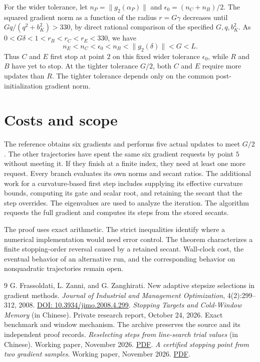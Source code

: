 \documentclass[11pt]{article}
\newcommand{\norm}[1]{\lVert#1\rVert}
\begin{document}
For the wider tolerance, let
\(n_P=\norm{g_2(\alpha_P)}\) and \(\epsilon_0=(n_C+n_B)/2\).
The squared gradient norm as a function of the radius \(r=G\gamma\)
decreases until \(Gq/(q^2+b_K^2)>330\), by direct rational
comparison of the specified \(G,q,b_K^2\).
As \(0<G\delta<1<r_B<r_C<r_E<330\), we have
\[
 n_E<n_C<\epsilon_0<n_B<\norm{g_2(\delta)}<G<L .
\]
Thus \(C\) and \(E\) first stop at point \(2\) on this fixed
wider tolerance \(\epsilon_0\), while \(R\) and \(B\) have yet to stop.
At the tighter tolerance \(G/2\), both \(C\) and \(E\) require more updates
than \(R\). The tighter tolerance depends only on the common
post-initialization gradient norm.

\section{Costs and scope}

The reference obtains six gradients and performs five actual
updates to meet \(G/2\). The other trajectories have spent the
same six gradient requests by point \(5\) without meeting it.
If they finish at a finite index, they need at least one more request.
Every branch evaluates its own norms and secant ratios. The
additional work for a curvature-based first step includes supplying
its effective curvature bounds, computing its gate and scalar
root, and retaining the secant that the step overrides.
The eigenvalues are used to analyze the iteration. The
algorithm requests the full gradient and computes its steps
from the stored secants.

The proof uses exact arithmetic. The strict inequalities identify
where a numerical implementation would need error control.
The theorem characterizes a finite stopping-order reversal
caused by a retained secant. Wall-clock cost, the eventual
behavior of an alternative run, and the corresponding behavior
on nonquadratic trajectories remain open.

\begin{thebibliography}{9}
G. Frassoldati, L. Zanni, and G. Zanghirati.
New adaptive stepsize selections in gradient methods.
\emph{Journal of Industrial and Management Optimization}, 4(2):299--312, 2008.
\href{https://doi.org/10.3934/jimo.2008.4.299}{DOI: 10.3934/jimo.2008.4.299}.
\emph{Stopping Targets and Cold-Window Memory} (in Chinese).
Private research report, October 24, 2026. Exact benchmark
and window mechanism. The archive preserves the source and its
independent proof records.
\emph{Reselecting steps from line-search trial values} (in Chinese).
Working paper, November 2026.
\href{https://taitai2025.github.io/assets/documents/research/trial-firsthit.pdf}{PDF}.
\emph{A certified stopping point from two gradient samples}.
Working paper, November 2026.
\href{https://taitai2025.github.io/assets/documents/research/certified-chord.pdf}{PDF}.
\end{thebibliography}
\end{document}
